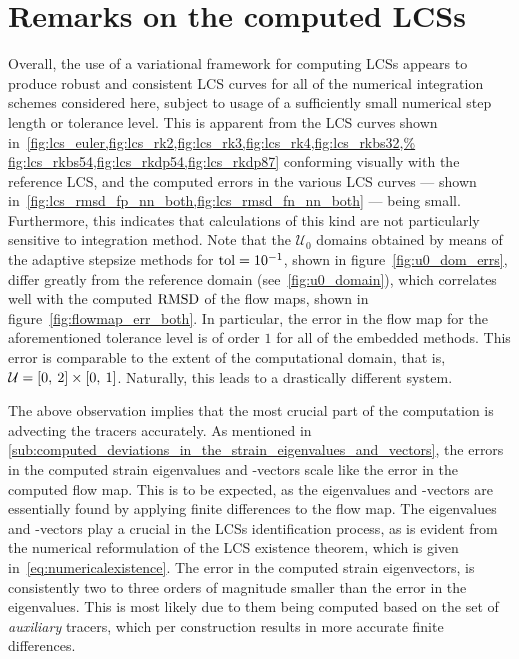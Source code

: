 \section{Remarks on the computed LCSs}
\label{sec:general_remarks}

Overall, the use of a variational framework for computing LCSs appears to
produce robust and consistent LCS curves for all of the numerical integration
schemes considered here, subject to usage of a sufficiently small numerical
step length or tolerance level. This is apparent from the LCS curves shown
in~\cref{fig:lcs_euler,fig:lcs_rk2,fig:lcs_rk3,fig:lcs_rk4,fig:lcs_rkbs32,%
fig:lcs_rkbs54,fig:lcs_rkdp54,fig:lcs_rkdp87} conforming visually with the
reference LCS, and the computed errors in the various LCS curves --- shown
in~\cref{fig:lcs_rmsd_fp_nn_both,fig:lcs_rmsd_fn_nn_both} --- being small.
Furthermore, this indicates that calculations of this kind
are not particularly sensitive to integration method. Note that the
$\mathcal{U}_{0}$ domains obtained by means of the adaptive stepsize methods
for $\textnormal{tol}=10^{-1}$, shown in figure~\ref{fig:u0_dom_errs}, differ
greatly from the reference domain (see~\cref{fig:u0_domain}), which correlates
well with the computed $\operatorname{RMSD}$ of the flow maps, shown in
figure~\ref{fig:flowmap_err_both}. In particular, the error in the flow map for
the aforementioned tolerance level is of order $1$ for all of the embedded
methods. This error is comparable to the extent of the computational domain,
that is, $\mathcal{U}=[0,\hspace{0.5ex}2]\times[0,\hspace{0.5ex}1]$. Naturally,
this leads to a drastically different system.

The above observation implies that the most crucial part of the computation is
advecting the tracers accurately. As mentioned in
\cref{sub:computed_deviations_in_the_strain_eigenvalues_and_vectors}, the errors
in the computed strain eigenvalues and -vectors scale like the error in the
computed flow map. This is to be expected, as the eigenvalues and -vectors are
essentially found by applying finite differences to the flow map. The
eigenvalues and -vectors play a crucial in the LCSs identification process, as
is evident from the numerical reformulation of the LCS existence theorem, which
is given in~\cref{eq:numericalexistence}. The error in the computed strain
eigenvectors, is consistently two to three orders of magnitude smaller than the
error in the eigenvalues. This is most likely due to them being computed based
on the set of \emph{auxiliary} tracers, which per construction results in more
accurate finite differences.

